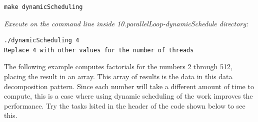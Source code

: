 \documentclass[letterpaper,10pt,openany,oneside]{sphinxmanual}
\begin{document}
\begin{Verbatim}[commandchars=\\\{\}]
make dynamicScheduling
\end{Verbatim}

\emph{Execute on the command line inside 10.parallelLoop-dynamicSchedule directory:}

\begin{Verbatim}[commandchars=\\\{\}]
./dynamicScheduling 4
Replace 4 with other values for the number of threads
\end{Verbatim}

The following example computes factorials for the numbers 2 through 512, placing the result in an array. This array of results is the data in this data decomposition pattern. Since each number will take a different amount of time to compute, this is
a case where using dynamic scheduling of the work improves the performance. Try the tasks lsited in the header of the code shown below to see this.
\end{document}
